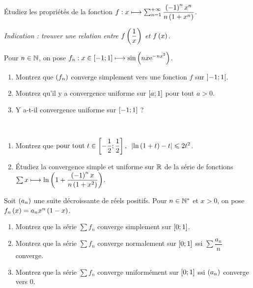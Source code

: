 \begin{exosss}
Étudiez les propriétés de la fonction \(f:x\longmapsto\sum_{n=1}^{+\infty}\dfrac{\left(-1\right)^nx^n}{n\left(1+x^n\right)}\).

\textit{Indication : trouver une relation entre \(f\left(\dfrac{1}{x}\right)\) et \(f\left(x\right)\).}
\end{exosss}

\begin{exo}
Pour \(n\in\mathbb{N}\), on pose \(f_n:x\in\left[-1;1\right]\longmapsto\sin\left(nx\mathrm{e}^{-nx^2}\right)\).

\begin{enumerate}
    \item Montrez que \(\left(f_n\right)\) converge simplement vers une fonction \(f\) sur \(\left]-1;1\right[\). \\
    \item Montrez qu'il y a convergence uniforme sur \(\left[a;1\right]\) pour tout \(a>0\). \\
    \item Y a-t-il convergence uniforme sur \(\left[-1;1\right]\) ?
\end{enumerate}
\end{exo}

\begin{exo}~\\
\begin{enumerate}
    \item Montrez que \(\quantifs{\tpt t\in\intervii{-\dfrac{1}{2}}{\dfrac{1}{2}}}\abs{\ln\paren{1+t}-t}\leq2t^2\). \\
    \item Étudiez la convergence simple et uniforme sur \(\mathbb{R}\) de la série de fonctions \(\sum x\longmapsto\ln\left(1+\dfrac{\left(-1\right)^nx}{n\left(1+x^2\right)}\right)\).
\end{enumerate}
\end{exo}

\begin{exo}
Soit \(\left(a_n\right)\) une suite décroissante de réels positifs. Pour \(n\in\mathbb{N}^*\) et \(x>0\), on pose \(f_n\left(x\right)=a_nx^n\left(1-x\right)\).

\begin{enumerate}
    \item Montrez que la série \(\sum f_n\) converge simplement sur \(\left[0;1\right]\). \\
    \item Montrez que la série \(\sum f_n\) converge normalement sur \(\left[0;1\right]\) ssi \(\sum\dfrac{a_n}{n}\) converge. \\
    \item Montrez que la série \(\sum f_n\) converge uniformément sur \(\left[0;1\right]\) ssi \(\left(a_n\right)\) converge vers \(0\).
\end{enumerate}
\end{exo}

